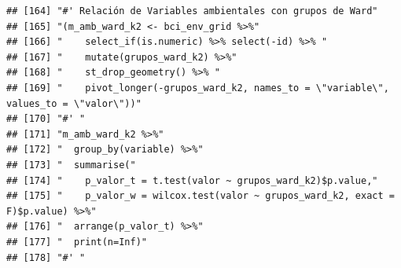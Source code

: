\documentclass[11pt,]{article}
\begin{document}
\begin{verbatim}
## [164] "#' Relación de Variables ambientales con grupos de Ward"                                                                                                               
## [165] "(m_amb_ward_k2 <- bci_env_grid %>%"                                                                                                                                    
## [166] "    select_if(is.numeric) %>% select(-id) %>% "                                                                                                                        
## [167] "    mutate(grupos_ward_k2) %>%"                                                                                                                                        
## [168] "    st_drop_geometry() %>% "                                                                                                                                           
## [169] "    pivot_longer(-grupos_ward_k2, names_to = \"variable\", values_to = \"valor\"))"                                                                                    
## [170] "#' "                                                                                                                                                                   
## [171] "m_amb_ward_k2 %>%"                                                                                                                                                     
## [172] "  group_by(variable) %>%"                                                                                                                                              
## [173] "  summarise("                                                                                                                                                          
## [174] "    p_valor_t = t.test(valor ~ grupos_ward_k2)$p.value,"                                                                                                               
## [175] "    p_valor_w = wilcox.test(valor ~ grupos_ward_k2, exact = F)$p.value) %>%"                                                                                           
## [176] "  arrange(p_valor_t) %>%"                                                                                                                                              
## [177] "  print(n=Inf)"                                                                                                                                                        
## [178] "#' "                                                                                                                                                                   

\end{verbatim}
\end{document}
